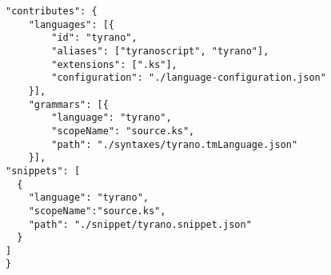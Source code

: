 \begin{lstlisting}[caption=package.jsonの一部]
  "contributes": {
    "languages": [{
        "id": "tyrano",
        "aliases": ["tyranoscript", "tyrano"],
        "extensions": [".ks"],
        "configuration": "./language-configuration.json"
    }],
    "grammars": [{
        "language": "tyrano",
        "scopeName": "source.ks",
        "path": "./syntaxes/tyrano.tmLanguage.json"
    }],
"snippets": [
  {
    "language": "tyrano",
    "scopeName":"source.ks",
    "path": "./snippet/tyrano.snippet.json"
  }
]
}
  \end{lstlisting}